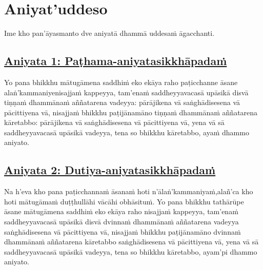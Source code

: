 
\section{Aniyat'uddeso}
\label{aniy}

\begin{intro}
	Ime kho pan'āyasmanto dve aniyatā dhammā uddesaṁ āgacchanti.
\end{intro}

\subsection*{\hyperref[unc1]{Aniyata 1: Paṭhama-aniyatasikkhāpadaṁ}}
\label{aniy1}

Yo pana bhikkhu mātugāmena saddhiṁ eko ekāya raho paṭicchanne āsane alaṅ'kammaniye\makeatletter\hyperlink{endnote114-appendix}\makeatother \thinspace nisajjaṁ kappeyya, tam'enaṁ saddheyyavacasā upāsikā disvā tiṇṇaṁ dhammānaṁ aññatarena vadeyya: pārājikena vā saṅghādisesena vā pācittiyena vā, nisajjaṁ bhikkhu paṭijānamāno tiṇṇaṁ dhammānaṁ aññatarena kāretabbo: pārājikena vā saṅghādisesena vā pācittiyena vā, yena vā sā saddheyyavacasā upāsikā vadeyya, tena so bhikkhu kāretabbo, ayaṁ dhammo aniyato.



\subsection*{\hyperref[unc2]{Aniyata 2: Dutiya-aniyatasikkhāpadaṁ}}
\label{aniy2}

Na h'eva kho pana paṭicchannaṁ āsanaṁ hoti n'ālaṅ'kammaniyaṁ,\makeatletter\hyperlink{endnote115-appendix}\makeatother \thinspace alañ'ca kho hoti mātugāmaṁ duṭṭhullāhi vācāhi obhāsituṁ. Yo pana bhikkhu tathārūpe āsane mātugāmena saddhiṁ eko ekāya raho nisajjaṁ kappeyya, tam'enaṁ saddheyyavacasā upāsikā disvā dvinnaṁ dhammānaṁ aññatarena vadeyya saṅghādisesena vā pācittiyena vā, nisajjaṁ bhikkhu paṭijānamāno dvinnaṁ dhammānaṁ aññatarena kāretabbo saṅghādisesena vā pācittiyena vā, yena vā sā saddheyyavacasā upāsikā vadeyya, tena so bhikkhu kāretabbo, ayam'pi dhammo aniyato.



